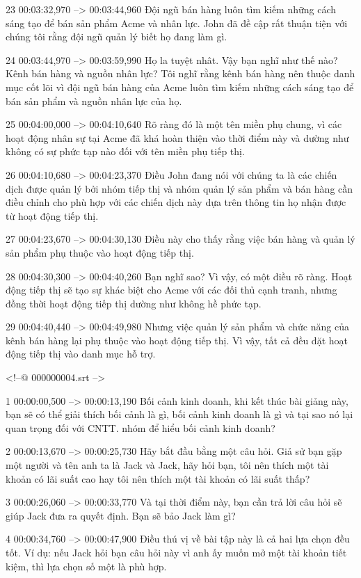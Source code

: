 23
00:03:32,970 --> 00:03:44,960
Đội ngũ bán hàng luôn tìm kiếm những cách sáng tạo để bán sản phẩm Acme và nhân lực.  John đã đề cập rất thuận tiện với chúng tôi rằng đội ngũ quản lý biết họ đang làm gì.

24
00:03:44,970 --> 00:03:59,990
Họ la tuyệt nhât.  Vậy bạn nghĩ như thế nào?  Kênh bán hàng và nguồn nhân lực?  Tôi nghĩ rằng kênh bán hàng nên thuộc danh mục cốt lõi vì đội ngũ bán hàng của Acme luôn tìm kiếm những cách sáng tạo để bán sản phẩm và nguồn nhân lực của họ.

25
00:04:00,000 --> 00:04:10,640
Rõ ràng đó là một tên miền phụ chung, vì các hoạt động nhân sự tại Acme đã khá hoàn thiện vào thời điểm này và dường như không có sự phức tạp nào đối với tên miền phụ tiếp thị.

26
00:04:10,680 --> 00:04:23,370
Điều John đang nói với chúng ta là các chiến dịch được quản lý bởi nhóm tiếp thị và nhóm quản lý sản phẩm và bán hàng cần điều chỉnh cho phù hợp với các chiến dịch này dựa trên thông tin họ nhận được từ hoạt động tiếp thị.

27
00:04:23,670 --> 00:04:30,130
Điều này cho thấy rằng việc bán hàng và quản lý sản phẩm phụ thuộc vào hoạt động tiếp thị.

28
00:04:30,300 --> 00:04:40,260
Bạn nghĩ sao?  Vì vậy, có một điều rõ ràng.  Hoạt động tiếp thị sẽ tạo sự khác biệt cho Acme với các đối thủ cạnh tranh, nhưng đồng thời hoạt động tiếp thị dường như không hề phức tạp.

29
00:04:40,440 --> 00:04:49,980
Nhưng việc quản lý sản phẩm và chức năng của kênh bán hàng lại phụ thuộc vào hoạt động tiếp thị.  Vì vậy, tất cả đều đặt hoạt động tiếp thị vào danh mục hỗ trợ.

<!--@ 000000004.srt -->

1
00:00:00,500 --> 00:00:13,190
Bối cảnh kinh doanh, khi kết thúc bài giảng này, bạn sẽ có thể giải thích bối cảnh là gì, bối cảnh kinh doanh là gì và tại sao nó lại quan trọng đối với CNTT.  nhóm để hiểu bối cảnh kinh doanh?

2
00:00:13,670 --> 00:00:25,730
Hãy bắt đầu bằng một câu hỏi.  Giả sử bạn gặp một người và tên anh ta là Jack và Jack, hãy hỏi bạn, tôi nên thích một tài khoản có lãi suất cao hay tôi nên thích một tài khoản có lãi suất thấp?

3
00:00:26,060 --> 00:00:33,770
Và tại thời điểm này, bạn cần trả lời câu hỏi sẽ giúp Jack đưa ra quyết định.  Bạn sẽ bảo Jack làm gì?

4
00:00:34,760 --> 00:00:47,900
Điều thú vị về bài tập này là cả hai lựa chọn đều tốt.  Ví dụ: nếu Jack hỏi bạn câu hỏi này vì anh ấy muốn mở một tài khoản tiết kiệm, thì lựa chọn số một là phù hợp.

